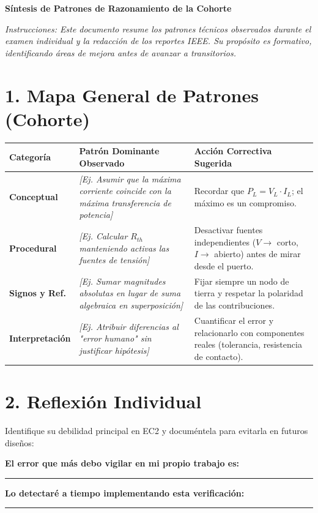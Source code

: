 \documentclass[11pt, a4paper]{article}
\begin{document}
\begin{tcolorbox}[colback=ucbblue!5!white, colframe=ucbblue, title=\textbf{Feedback Analítico Agregado: Unidad EC2}]
    \centering \textbf{Síntesis de Patrones de Razonamiento de la Cohorte}
\end{tcolorbox}

\noindent \textit{Instrucciones: Este documento resume los patrones técnicos observados durante el examen individual y la redacción de los reportes IEEE. Su propósito es formativo, identificando áreas de mejora antes de avanzar a transitorios.}

\vspace{0.4cm}
\section*{1. Mapa General de Patrones (Cohorte)}

\renewcommand{\arraystretch}{1.5}
\noindent
\begin{tabularx}{\textwidth}{>{\bfseries\RaggedRight}p{2.5cm} >{\RaggedRight\arraybackslash}X >{\RaggedRight\arraybackslash}X}
\toprule
\textbf{Categoría} & \textbf{Patrón Dominante Observado} & \textbf{Acción Correctiva Sugerida} \\ 
\midrule
Conceptual & \textit{[Ej. Asumir que la máxima corriente coincide con la máxima transferencia de potencia]} & Recordar que $P_L = V_L \cdot I_L$; el máximo es un compromiso. \\ \addlinespace
Procedural & \textit{[Ej. Calcular $R_{th}$ manteniendo activas las fuentes de tensión]} & Desactivar fuentes independientes ($V \rightarrow$ corto, $I \rightarrow$ abierto) antes de mirar desde el puerto. \\ \addlinespace
Signos y Ref. & \textit{[Ej. Sumar magnitudes absolutas en lugar de suma algebraica en superposición]} & Fijar siempre un nodo de tierra y respetar la polaridad de las contribuciones. \\ \addlinespace
Interpretación & \textit{[Ej. Atribuir diferencias al "error humano" sin justificar hipótesis]} & Cuantificar el error y relacionarlo con componentes reales (tolerancia, resistencia de contacto). \\
\bottomrule
\end{tabularx}

\vspace{0.4cm}
\section*{2. Reflexión Individual}
Identifique su debilidad principal en EC2 y documéntela para evitarla en futuros diseños:

\vspace{0.2cm}
\noindent \textbf{El error que más debo vigilar en mi propio trabajo es:} \\
\rule{\textwidth}{0.4pt}
\vspace{0.2cm}

\noindent \textbf{Lo detectaré a tiempo implementando esta verificación:} \\
\rule{\textwidth}{0.4pt}
\end{document}
